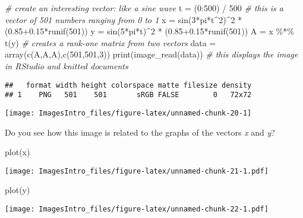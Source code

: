 \documentclass[
]{article}
\newenvironment{Shaded}{\begin{snugshade}}{\end{snugshade}}
\newcommand{\CommentTok}[1]{\textcolor[rgb]{0.56,0.35,0.01}{\textit{#1}}}
\newcommand{\DecValTok}[1]{\textcolor[rgb]{0.00,0.00,0.81}{#1}}
\newcommand{\FloatTok}[1]{\textcolor[rgb]{0.00,0.00,0.81}{#1}}
\newcommand{\FunctionTok}[1]{\textcolor[rgb]{0.00,0.00,0.00}{#1}}
\newcommand{\NormalTok}[1]{#1}
\newcommand{\OtherTok}[1]{\textcolor[rgb]{0.56,0.35,0.01}{#1}}
\newcommand{\SpecialCharTok}[1]{\textcolor[rgb]{0.00,0.00,0.00}{#1}}
\begin{document}
\begin{Shaded}
\begin{Highlighting}[]
\CommentTok{\# create an interesting vector: like a sine wave }
\NormalTok{t }\OtherTok{=}\NormalTok{ (}\DecValTok{0}\SpecialCharTok{:}\DecValTok{500}\NormalTok{) }\SpecialCharTok{/} \DecValTok{500} \CommentTok{\# this is a vector of 501 numbers ranging from 0 to 1}
\NormalTok{x }\OtherTok{=} \FunctionTok{sin}\NormalTok{(}\DecValTok{3}\SpecialCharTok{*}\NormalTok{pi}\SpecialCharTok{*}\NormalTok{t}\SpecialCharTok{\^{}}\DecValTok{2}\NormalTok{)}\SpecialCharTok{\^{}}\DecValTok{2} \SpecialCharTok{*}\NormalTok{ (}\FloatTok{0.85+0.15}\SpecialCharTok{*}\FunctionTok{runif}\NormalTok{(}\DecValTok{501}\NormalTok{)) }
\NormalTok{y }\OtherTok{=} \FunctionTok{sin}\NormalTok{(}\DecValTok{5}\SpecialCharTok{*}\NormalTok{pi}\SpecialCharTok{*}\NormalTok{t)}\SpecialCharTok{\^{}}\DecValTok{2} \SpecialCharTok{*}\NormalTok{ (}\FloatTok{0.85+0.15}\SpecialCharTok{*}\FunctionTok{runif}\NormalTok{(}\DecValTok{501}\NormalTok{))   }
\NormalTok{A }\OtherTok{=}\NormalTok{ x }\SpecialCharTok{\%*\%} \FunctionTok{t}\NormalTok{(y) }\CommentTok{\# creates a rank{-}one matrix from two vectors}
\NormalTok{data }\OtherTok{=} \FunctionTok{array}\NormalTok{(}\FunctionTok{c}\NormalTok{(A,A,A),}\FunctionTok{c}\NormalTok{(}\DecValTok{501}\NormalTok{,}\DecValTok{501}\NormalTok{,}\DecValTok{3}\NormalTok{))}
\FunctionTok{print}\NormalTok{(}\FunctionTok{image\_read}\NormalTok{(data)) }\CommentTok{\# this displays the image in RStudio and knitted documents}
\end{Highlighting}
\end{Shaded}

\begin{verbatim}
##   format width height colorspace matte filesize density
## 1    PNG   501    501       sRGB FALSE        0   72x72
\end{verbatim}

\texttt{[image: ImagesIntro\_files/figure-latex/unnamed-chunk-20-1]}

Do you see how this image is related to the graphs of the vectors
\emph{x} and \emph{y}?

\begin{Shaded}
\begin{Highlighting}[]
\FunctionTok{plot}\NormalTok{(x)}
\end{Highlighting}
\end{Shaded}

\texttt{[image: ImagesIntro\_files/figure-latex/unnamed-chunk-21-1.pdf]}

\begin{Shaded}
\begin{Highlighting}[]
\FunctionTok{plot}\NormalTok{(y)}
\end{Highlighting}
\end{Shaded}

\texttt{[image: ImagesIntro\_files/figure-latex/unnamed-chunk-22-1.pdf]}
\end{document}
